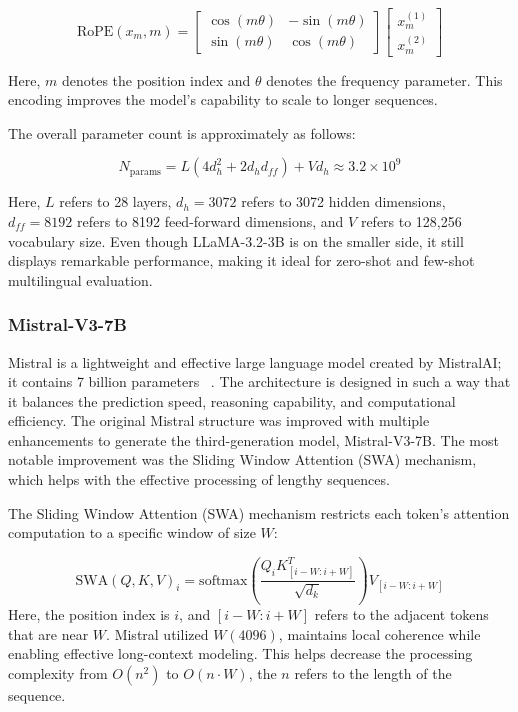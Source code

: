 \documentclass[10pt,letterpaper]{article}
\begin{document}
\begin{equation}
\text{RoPE}(x_m,m)=
\begin{bmatrix}
\cos(m\theta)&-\sin(m\theta)\\
\sin(m\theta)&\cos(m\theta)
\end{bmatrix}
\begin{bmatrix}
x_m^{(1)}\\
x_m^{(2)}
\end{bmatrix}
\label{eq:rope}
\end{equation}

Here, \(m\) denotes the position index and \(\theta\) denotes the frequency parameter. This encoding improves the model’s capability to scale to longer sequences. 

The overall parameter count is approximately as follows: 

\begin{equation}
N_{\text{params}} = L(4d_h^2 + 2d_h d_{ff}) + V d_h \approx 3.2\times10^9
\label{eq:llama_params}
\end{equation}

Here, \(L\) refers to 28 layers, \(d_h=3072\) refers to 3072 hidden dimensions, \(d_{ff}=8192\) refers to 8192 feed-forward dimensions, and \(V\) refers to 128,256 vocabulary size. Even though LLaMA-3.2-3B is on the smaller side, it still displays remarkable performance, making it ideal for zero-shot and few-shot multilingual evaluation. 

\subsubsection*{Mistral-V3-7B}
Mistral is a lightweight and effective large language model created by MistralAI; it contains 7 billion parameters ~\cite{b37}. The architecture is designed in such a way that it balances the prediction speed, reasoning capability, and computational efficiency. The original Mistral structure was improved with multiple enhancements to generate the third-generation model, Mistral-V3-7B. The most notable improvement was the Sliding Window Attention  (SWA) mechanism, which helps with the effective processing of lengthy sequences. 

The Sliding Window Attention (SWA) mechanism restricts each token’s attention computation to a specific window of size \(W\):

\begin{equation}
\text{SWA}(Q,K,V)_i = \text{softmax}\!\left(\frac{Q_iK_{[i-W:i+W]}^{T}}{\sqrt{d_k}}\right)V_{[i-W:i+W]}
\label{eq:swa}
\end{equation}
Here, the position index is \(i\), and \([i-W:i+W]\) refers to the adjacent tokens that are near \(W\). Mistral utilized \(W (4096)\), maintains local coherence while enabling effective long-context modeling. This helps decrease the processing complexity from \(O(n^2)\) to \(O(n \cdot W)\), the \(n\) refers to the length of the sequence. 
\end{document}

